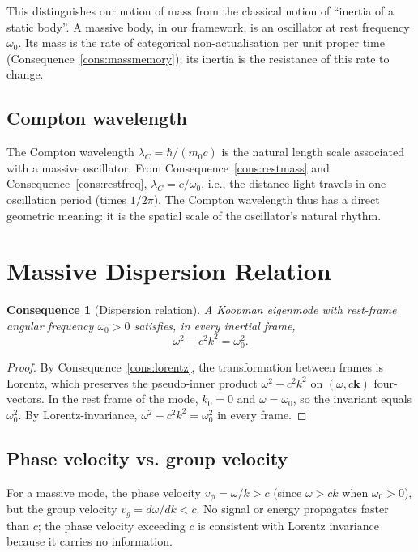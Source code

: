 \documentclass[11pt,twocolumn,a4paper]{article}
\theoremstyle{axiomstyle}
\theoremstyle{conseqstyle}
\newtheorem{consequence}{Consequence}
\theoremstyle{definition}
\theoremstyle{remark}
\begin{document}
This distinguishes our notion of mass from the classical notion of ``inertia of a static body''. A massive body, in our framework, is an oscillator at rest frequency $\omega_{0}$. Its mass is the rate of categorical non-actualisation per unit proper time (Consequence~\ref{cons:massmemory}); its inertia is the resistance of this rate to change.

\subsection{Compton wavelength}

The Compton wavelength $\lambda_{C}=\hbar/(m_{0}c)$ is the natural length scale associated with a massive oscillator. From Consequence~\ref{cons:restmass} and Consequence~\ref{cons:restfreq}, $\lambda_{C}=c/\omega_{0}$, i.e., the distance light travels in one oscillation period (times $1/2\pi$). The Compton wavelength thus has a direct geometric meaning: it is the spatial scale of the oscillator's natural rhythm.

\section{Massive Dispersion Relation}
\label{sec:dispersion}

\begin{consequence}[Dispersion relation]
\label{cons:dispersion}
A Koopman eigenmode with rest-frame angular frequency $\omega_{0}>0$ satisfies, in every inertial frame,
\begin{equation}
\omega^{2}-c^{2}k^{2}=\omega_{0}^{2}.
\label{eq:dispersion}
\end{equation}
\end{consequence}

\begin{proof}
By Consequence~\ref{cons:lorentz}, the transformation between frames is Lorentz, which preserves the pseudo-inner product $\omega^{2}-c^{2}k^{2}$ on $(\omega,c\mathbf{k})$ four-vectors. In the rest frame of the mode, $k_{0}=0$ and $\omega=\omega_{0}$, so the invariant equals $\omega_{0}^{2}$. By Lorentz-invariance, $\omega^{2}-c^{2}k^{2}=\omega_{0}^{2}$ in every frame.
\end{proof}

\subsection{Phase velocity vs. group velocity}

For a massive mode, the phase velocity $v_{\phi}=\omega/k>c$ (since $\omega>ck$ when $\omega_{0}>0$), but the group velocity $v_{g}=d\omega/dk<c$. No signal or energy propagates faster than $c$; the phase velocity exceeding $c$ is consistent with Lorentz invariance because it carries no information.
\end{document}
